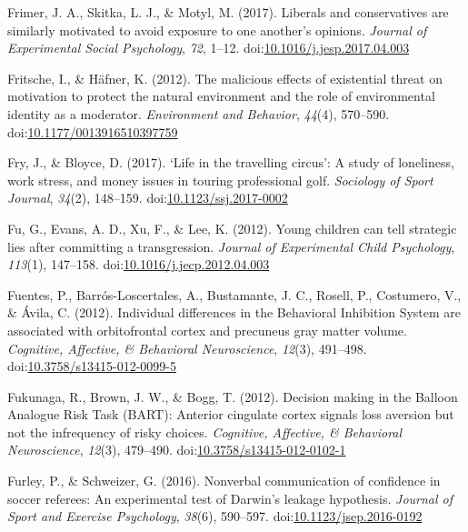 \documentclass[english,man]{apa6}
\theoremstyle{definition}
\theoremstyle{definition}
\theoremstyle{definition}
\theoremstyle{remark}
\begin{document}
\hypertarget{ref-Frimer2017}{}
Frimer, J. A., Skitka, L. J., \& Motyl, M. (2017). Liberals and
conservatives are similarly motivated to avoid exposure to one another's
opinions. \emph{Journal of Experimental Social Psychology}, \emph{72},
1--12.
doi:\href{https://doi.org/10.1016/j.jesp.2017.04.003}{10.1016/j.jesp.2017.04.003}

\hypertarget{ref-Fritsche2012}{}
Fritsche, I., \& Häfner, K. (2012). The malicious effects of existential
threat on motivation to protect the natural environment and the role of
environmental identity as a moderator. \emph{Environment and Behavior},
\emph{44}(4), 570--590.
doi:\href{https://doi.org/10.1177/0013916510397759}{10.1177/0013916510397759}

\hypertarget{ref-Fry2017}{}
Fry, J., \& Bloyce, D. (2017). `Life in the travelling circus': A study
of loneliness, work stress, and money issues in touring professional
golf. \emph{Sociology of Sport Journal}, \emph{34}(2), 148--159.
doi:\href{https://doi.org/10.1123/ssj.2017-0002}{10.1123/ssj.2017-0002}

\hypertarget{ref-Fu2012}{}
Fu, G., Evans, A. D., Xu, F., \& Lee, K. (2012). Young children can tell
strategic lies after committing a transgression. \emph{Journal of
Experimental Child Psychology}, \emph{113}(1), 147--158.
doi:\href{https://doi.org/10.1016/j.jecp.2012.04.003}{10.1016/j.jecp.2012.04.003}

\hypertarget{ref-Fuentes2012}{}
Fuentes, P., Barrós-Loscertales, A., Bustamante, J. C., Rosell, P.,
Costumero, V., \& Ávila, C. (2012). Individual differences in the
Behavioral Inhibition System are associated with orbitofrontal cortex
and precuneus gray matter volume. \emph{Cognitive, Affective, \&
Behavioral Neuroscience}, \emph{12}(3), 491--498.
doi:\href{https://doi.org/10.3758/s13415-012-0099-5}{10.3758/s13415-012-0099-5}

\hypertarget{ref-Fukunaga2012}{}
Fukunaga, R., Brown, J. W., \& Bogg, T. (2012). Decision making in the
Balloon Analogue Risk Task (BART): Anterior cingulate cortex signals
loss aversion but not the infrequency of risky choices. \emph{Cognitive,
Affective, \& Behavioral Neuroscience}, \emph{12}(3), 479--490.
doi:\href{https://doi.org/10.3758/s13415-012-0102-1}{10.3758/s13415-012-0102-1}

\hypertarget{ref-Furley2016}{}
Furley, P., \& Schweizer, G. (2016). Nonverbal communication of
confidence in soccer referees: An experimental test of Darwin's leakage
hypothesis. \emph{Journal of Sport and Exercise Psychology},
\emph{38}(6), 590--597.
doi:\href{https://doi.org/10.1123/jsep.2016-0192}{10.1123/jsep.2016-0192}
\end{document}
